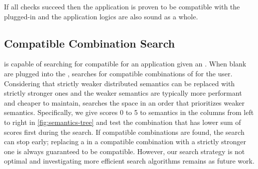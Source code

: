 If all checks succeed then the application is proven to be compatible
with the plugged-in \sysmods{} and the application logics are also
sound as a whole.

\subsection{Compatible Combination Search}

\sysname{} is capable of searching for compatible \sysmods{} for an
application given an \sysgraph{}. When blank \sysmods{} are plugged into the
\sysgraph{}, \sysname{} searches for compatible combinations of
\sysmods{} for the user.
Considering that strictly weaker distributed semantics can be replaced
with strictly stronger ones and the weaker semantics are typically
more performant and cheaper to maintain, \sysname{} searches the space
in an order that prioritizes weaker semantics. Specifically, we give scores
0 to 5 to semantics in the columns from left to right in
\cref{fig:semantics-tree}
and test the combination that has lower sum of scores first during the search.
If compatible combinations are found, the search can stop early; replacing a
\sysmod{} in a compatible combination with a strictly stronger one is always
guaranteed to be compatible.
However, our search strategy is not optimal and investigating more
efficient search algorithms remains as future work.


